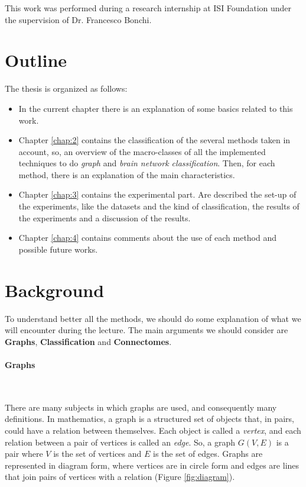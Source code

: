 This work was performed during a research internship at ISI Foundation
under the supervision of Dr. Francesco Bonchi.

\section{Outline}
The thesis is organized as follows:

\begin{itemize}
	\item In the current chapter there is an explanation of some basics related to this work.
	\item Chapter \ref{chap:2} contains the classification of the several methods taken in account, so, an overview of the macro-classes of all the implemented techniques to do \emph{graph} and \emph{brain network classification}. 
	Then, for each method, there is an explanation of the main characteristics.
	\item Chapter \ref{chap:3} contains the experimental part. Are described the set-up of the experiments, like the datasets and the kind of classification, the results of the experiments and a discussion of the results.
	\item Chapter \ref{chap:4} contains comments about the use of each method and possible future works. 
\end{itemize}

\section{Background}
To understand better all the methods, we should do some explanation of what we will encounter during the lecture. The main arguments we should consider are \textbf{Graphs}, \textbf{Classification} and \textbf{Connectomes}.

\paragraph{Graphs}\
\vspace{0.5cm}

There are many subjects in which graphs are used, and consequently many definitions. In mathematics, a graph is a structured set of objects that, in pairs, could have a relation between themselves. Each object is called a \textit{vertex}, and each relation between a pair of vertices is called an \textit{edge}. So, a graph $ G(V,E) $ is a pair where $ V $ is the set of vertices and $ E $ is the set of edges. Graphs are represented in diagram form, where vertices are in circle form and edges are lines that join pairs of vertices with a relation (Figure \ref{fig:diagram}).
\vspace{0.5cm}

